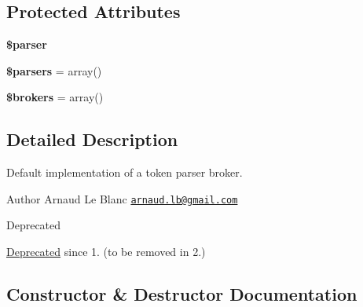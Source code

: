 \subsection*{Protected Attributes}
\begin{DoxyCompactItemize}
\item 
{\bfseries \$parser}\hypertarget{classTwig__TokenParserBroker_a9ce448d524e693fb0e3859f776037098}{}\label{classTwig__TokenParserBroker_a9ce448d524e693fb0e3859f776037098}

\item 
{\bfseries \$parsers} = array()\hypertarget{classTwig__TokenParserBroker_aab6e7762d4f99e87f1dc3fcd99996730}{}\label{classTwig__TokenParserBroker_aab6e7762d4f99e87f1dc3fcd99996730}

\item 
{\bfseries \$brokers} = array()\hypertarget{classTwig__TokenParserBroker_aced15b2faa8c071ed935bb2da1825e52}{}\label{classTwig__TokenParserBroker_aced15b2faa8c071ed935bb2da1825e52}

\end{DoxyCompactItemize}


\subsection{Detailed Description}
Default implementation of a token parser broker.

\begin{DoxyAuthor}{Author}
Arnaud Le Blanc \href{mailto:arnaud.lb@gmail.com}{\tt arnaud.\+lb@gmail.\+com}
\end{DoxyAuthor}
\begin{DoxyRefDesc}{Deprecated}
\item[\hyperlink{deprecated__deprecated000043}{Deprecated}]since 1. (to be removed in 2.) \end{DoxyRefDesc}


\subsection{Constructor \& Destructor Documentation}
